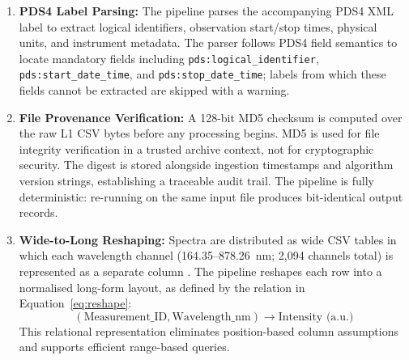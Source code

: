 \documentclass[final,5p,twocolumn,a4paper]{elsarticle}
\begin{document}
\begin{enumerate}
    \item \textbf{PDS4 Label Parsing:} The pipeline parses the accompanying PDS4 XML label to extract logical identifiers, observation start/stop times, physical units, and instrument metadata. The parser follows PDS4 field semantics \cite{pds4_standard} to locate mandatory fields including \texttt{pds:logical\_identifier}, \texttt{pds:start\_date\_time}, and \texttt{pds:stop\_date\_time}; labels from which these fields cannot be extracted are skipped with a warning.
    \item \textbf{File Provenance Verification:} A 128-bit MD5 checksum is computed over the raw L1 CSV bytes before any processing begins. MD5 is used for file integrity verification in a trusted archive context, not for cryptographic security. The digest is stored alongside ingestion timestamps and algorithm version strings, establishing a traceable audit trail. The pipeline is fully deterministic: re-running on the same input file produces bit-identical output records.
    \item \textbf{Wide-to-Long Reshaping:} Spectra are distributed as wide CSV tables in which each wavelength channel (164.35--878.26~nm; 2,094 channels total) is represented as a separate column \cite{numpy, pandas}. The pipeline reshapes each row into a normalised long-form layout, as defined by the relation in Equation~\eqref{eq:reshape}:
    \begin{equation}
        \label{eq:reshape}
        (\text{Measurement\_ID}, \text{Wavelength\_nm}) \rightarrow \text{Intensity (a.u.)}
    \end{equation}
    This relational representation eliminates position-based column assumptions and supports efficient range-based queries.




\end{enumerate}
\end{document}

